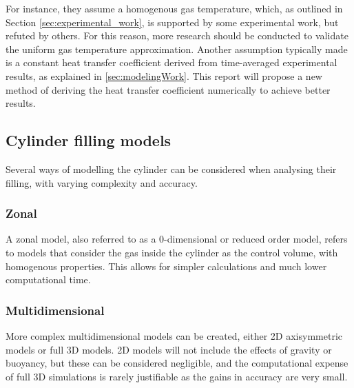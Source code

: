 
For instance, they  assume a homogenous gas temperature, which, as outlined in Section \ref{sec:experimental_work}, is supported by some experimental work, but refuted by others. For this reason, more research should be conducted to validate the uniform gas temperature approximation. Another assumption typically made is a constant heat transfer coefficient derived from time-averaged experimental results, as explained in \cref{sec:modelingWork}. This report will propose a new method of deriving the heat transfer coefficient numerically to achieve better results.



\subsection{Cylinder filling models}

Several ways of modelling the cylinder can be considered when analysing their filling, with varying complexity and accuracy.

\subsubsection{Zonal}

A zonal model, also referred to as a 0-dimensional or reduced order model, refers to models that consider the gas inside the cylinder as the control volume, with homogenous properties. This allows for simpler calculations and much lower computational time.   

\subsubsection{Multidimensional}
\label{sec:multidimensional}

More complex multidimensional models can be created, either 2D axisymmetric models or full 3D models. 2D models will not include the effects of gravity or buoyancy, but these can be considered negligible, and the computational expense of full 3D simulations is rarely justifiable as the gains in accuracy are very small. 


